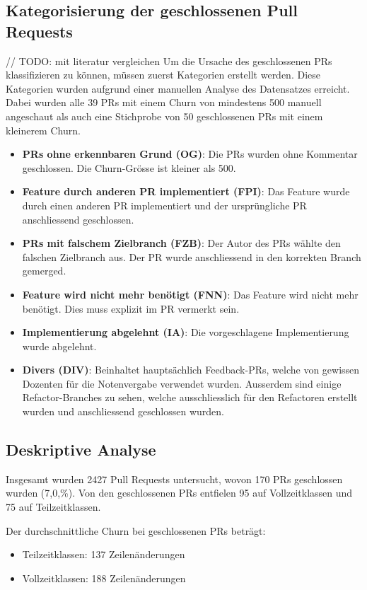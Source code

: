 \subsection{Kategorisierung der geschlossenen Pull Requests}
\label{sec:KategorienGeschlossenePRs} 
// TODO: mit literatur vergleichen
Um die Ursache des geschlossenen PRs klassifizieren zu können, müssen zuerst Kategorien erstellt werden. Diese Kategorien wurden aufgrund einer manuellen Analyse des Datensatzes erreicht. Dabei wurden alle 39 PRs mit einem Churn von mindestens 500 manuell angeschaut als auch eine Stichprobe von 50 geschlossenen PRs mit einem kleinerem Churn.
\begin{itemize}
    \item \textbf{PRs ohne erkennbaren Grund (OG)}: Die PRs wurden ohne Kommentar geschlossen. Die Churn-Grösse ist kleiner als 500.
    \item \textbf{Feature durch anderen PR implementiert (FPI)}: Das Feature wurde durch einen anderen PR implementiert und der ursprüngliche PR anschliessend geschlossen.
    \item \textbf{PRs mit falschem Zielbranch (FZB)}: Der Autor des PRs wählte den falschen Zielbranch aus. Der PR wurde anschliessend in den korrekten Branch gemerged.
    \item \textbf{Feature wird nicht mehr benötigt (FNN)}: Das Feature wird nicht mehr benötigt. Dies muss explizit im PR vermerkt sein.
    \item \textbf{Implementierung abgelehnt (IA)}: Die vorgeschlagene Implementierung wurde abgelehnt.
    \item \textbf{Divers (DIV)}: Beinhaltet hauptsächlich Feedback-PRs, welche von gewissen Dozenten für die Notenvergabe verwendet wurden. Ausserdem sind einige Refactor-Branches zu sehen, welche ausschliesslich für den Refactoren erstellt wurden und anschliessend geschlossen wurden. 
\end{itemize}

\subsection{Deskriptive Analyse}
Insgesamt wurden 2427 Pull Requests untersucht, wovon 170 PRs geschlossen wurden (7,0,\%). Von den geschlossenen PRs entfielen 95 auf Vollzeitklassen und 75 auf Teilzeitklassen.

Der durchschnittliche Churn bei geschlossenen PRs beträgt: \begin{itemize} \item Teilzeitklassen: 137 Zeilenänderungen \item Vollzeitklassen: 188 Zeilenänderungen \end{itemize}


